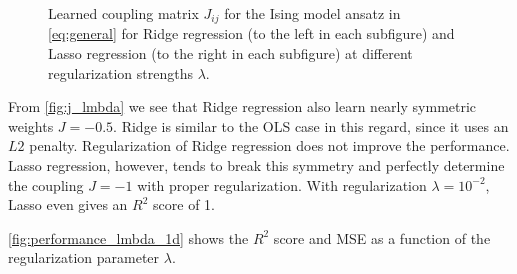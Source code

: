 \begin{figure}[H]
\qquad
{}
\qquad
{}
\caption{Learned coupling matrix $J_{ij}$ for the Ising model ansatz in \autoref{eq:general} for Ridge regression (to the left in each subfigure) and Lasso regression (to the right in each subfigure) at different regularization strengths $\lambda$. }
\label{fig:j_lmbda}
\end{figure}

From \autoref{fig:j_lmbda} we see that Ridge regression also learn nearly symmetric weights $J=-0.5$. Ridge is similar to the OLS case in this regard, since it uses an $L2$ penalty. Regularization of Ridge regression does not improve the performance. Lasso regression, however, tends to break this symmetry and perfectly determine the coupling $J=-1$ with proper regularization. With regularization $\lambda = 10^{-2}$, Lasso even gives an $R^2$ score of 1. 

\autoref{fig:performance_lmbda_1d} shows the $R^2$ score and MSE as a function of the regularization parameter $\lambda$.

